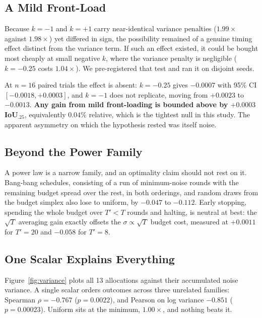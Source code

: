 \subsection{A Mild Front-Load}
\label{sec:frontload}

Because $k=-1$ and $k=+1$ carry near-identical variance penalties
($1.99\times$ against $1.98\times$) yet differed in sign, the possibility
remained of a genuine timing effect distinct from the variance term. If such an
effect existed, it could be bought most cheaply at small negative $k$, where the
variance penalty is negligible ($k=-0.25$ costs $1.04\times$). We pre-registered
that test and ran it on disjoint seeds.

\vspace{10pt}

At $n=16$ paired trials the effect is absent: $k=-0.25$ gives $-0.0007$ with
95\% CI $[-0.0018,+0.0003]$, and $k=-1$ does not replicate, moving from
$+0.0023$ to $-0.0013$. \textbf{Any gain from mild front-loading is bounded
above by $+0.0003$ IoU$_{.25}$}, equivalently $0.04\%$ relative, which is the
tightest null in this study. The apparent asymmetry on which the hypothesis
rested was itself noise.

\subsection{Beyond the Power Family}

A power law is a narrow family, and an optimality claim should not rest on it.
Bang-bang schedules, consisting of a run of minimum-noise rounds with the
remaining budget spread over the rest, in both orderings, and random draws from
the budget simplex also lose to uniform, by $-0.047$ to $-0.112$. Early
stopping, spending the whole budget over $T'<T$ rounds and halting, is neutral
at best: the $\sqrt{T}$ averaging gain exactly offsets the
$\sigma\propto\sqrt{T}$ budget cost, measured at $+0.0011$ for $T'=20$ and
$-0.058$ for $T'=8$.

\subsection{One Scalar Explains Everything}

Figure~\ref{fig:variance} plots all 13 allocations against their accumulated
noise variance. A single scalar orders outcomes across three unrelated families:
Spearman $\rho=-0.767$ ($p=0.0022$), and Pearson on log variance $-0.851$
($p=0.00023$). Uniform sits at the minimum, $1.00\times$, and nothing beats it.

